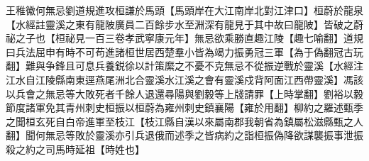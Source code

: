 王稚徽何無忌劉道規進攻桓謙於馬頭【馬頭岸在大江南岸北對江津口】桓蔚於龍泉【水經註靈溪之東有龍陂廣員二百餘步水至淵深有龍見于其中故曰龍陂】皆破之蔚祕之子也【桓祕見一百三卷孝武寧康元年】無忌欲乘勝直趣江陵【趣七喻翻】道規曰兵法屈申有時不可苟進諸桓世居西楚羣小皆為竭力振勇冠三軍【為于偽翻冠古玩翻】難與争鋒且可息兵養鋭徐以計策縻之不憂不克無忌不從振逆戰於靈溪【水經注江水自江陵縣南東逕燕尾洲北合靈溪水江溪之會有靈溪戍背阿面江西帶靈溪】馮該以兵會之無忌等大敗死者千餘人退還尋陽與劉毅等上牋請罪【上時掌翻】劉裕以毅節度諸軍免其青州刺史桓振以桓蔚為雍州刺史鎮襄陽【雍於用翻】柳約之羅述甄季之聞桓玄死自白帝進軍至枝江【枝江縣自漢以來屬南郡我朝省為鎮屬松滋縣甄之人翻】聞何無忌等敗於靈溪亦引兵退俄而述季之皆病約之詣桓振偽降欲謀襲振事泄振殺之約之司馬時延祖【時姓也】